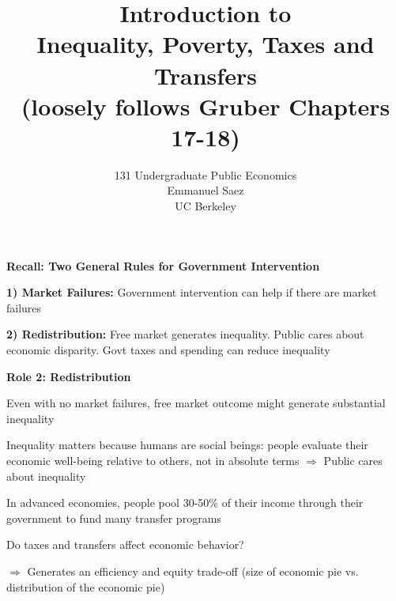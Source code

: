 \documentclass[landscape]{slides}
\author{131 Undergraduate Public Economics \\ Emmanuel Saez \\ UC Berkeley}
\date{}
\title{Introduction to \\
Inequality, Poverty, Taxes and Transfers \\ (loosely follows Gruber Chapters 17-18)} \onlyslides{1-300}
\begin{document}
\begin{slide}
\maketitle
\end{slide}


\begin{slide}
\begin{center}
{\bf Recall: Two General Rules for Government Intervention}
\end{center}

\textbf{1) Market Failures:} Government intervention can help
if there are market failures

\textbf{2) Redistribution:} Free market generates inequality. Public cares about
economic disparity. Govt taxes
and spending can reduce inequality 

\end{slide}

\begin{slide}
\begin{center}
{\bf Role 2: Redistribution}
\end{center}

Even with no market failures, free market outcome might generate
substantial inequality

Inequality matters because humans are social beings: people evaluate their economic well-being
relative to others, not in absolute terms  $\Rightarrow$ Public cares about inequality

In advanced economies, people pool 30-50\% of their income through their government
to fund many transfer programs

Do taxes and transfers affect economic behavior?

$\Rightarrow$ Generates an
efficiency and equity trade-off (size of economic pie vs. distribution of the economic pie)



\end{slide}
\end{document}
